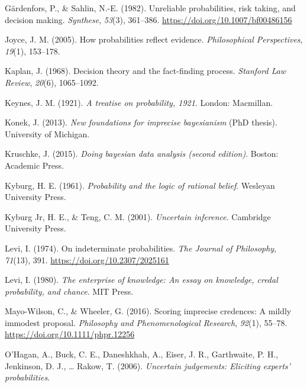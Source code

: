 \documentclass[
  10pt,
  dvipsnames,enabledeprecatedfontcommands]{scrartcl}
\newlength{\cslhangindent}
\newlength{\cslentryspacingunit} %
\newenvironment{CSLReferences}[2] %
 {%
  \setlength{\parindent}{0pt}
  \ifodd #1
  \let\oldpar\par
  \def\par{\hangindent=\cslhangindent\oldpar}
  \fi
  \setlength{\parskip}{#2\cslentryspacingunit}
 }%
 {}
\begin{document}
\begin{CSLReferences}{1}{0}
\leavevmode{}%
Gärdenfors, P., \& Sahlin, N.-E. (1982). Unreliable probabilities, risk
taking, and decision making. \emph{Synthese}, \emph{53}(3), 361--386.
\url{https://doi.org/10.1007/bf00486156}

\leavevmode{}%
Joyce, J. M. (2005). How probabilities reflect evidence.
\emph{Philosophical Perspectives}, \emph{19}(1), 153--178.

\leavevmode{}%
Kaplan, J. (1968). Decision theory and the fact-finding process.
\emph{Stanford Law Review}, \emph{20}(6), 1065--1092.

\leavevmode{}%
Keynes, J. M. (1921). \emph{A treatise on probability, 1921}. London:
Macmillan.

\leavevmode{}%
Konek, J. (2013). \emph{New foundations for imprecise bayesianism} (PhD
thesis). University of Michigan.

\leavevmode{}%
Kruschke, J. (2015). \emph{Doing bayesian data analysis (second
edition)}. Boston: Academic Press.

\leavevmode{}%
Kyburg, H. E. (1961). \emph{Probability and the logic of rational
belief}. Wesleyan University Press.

\leavevmode{}%
Kyburg Jr, H. E., \& Teng, C. M. (2001). \emph{Uncertain inference}.
Cambridge University Press.

\leavevmode{}%
Levi, I. (1974). On indeterminate probabilities. \emph{The Journal of
Philosophy}, \emph{71}(13), 391. \url{https://doi.org/10.2307/2025161}

\leavevmode{}%
Levi, I. (1980). \emph{The enterprise of knowledge: An essay on
knowledge, credal probability, and chance}. MIT Press.

\leavevmode{}%
Mayo-Wilson, C., \& Wheeler, G. (2016). Scoring imprecise credences: A
mildly immodest proposal. \emph{Philosophy and Phenomenological
Research}, \emph{92}(1), 55--78.
\url{https://doi.org/10.1111/phpr.12256}

\leavevmode{}%
O'Hagan, A., Buck, C. E., Daneshkhah, A., Eiser, J. R., Garthwaite, P.
H., Jenkinson, D. J., \ldots{} Rakow, T. (2006). \emph{Uncertain
judgements: Eliciting experts' probabilities}.


\end{CSLReferences}
\end{document}
